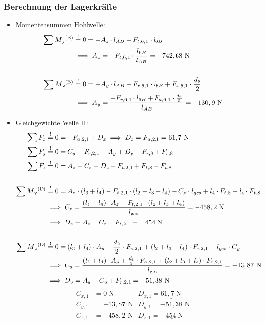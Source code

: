 \subsubsection{Berechnung der Lagerkräfte}
\begin{itemize}
\item Momentensummen Hohlwelle:
\begin{align*}
	\sum M\textsubscript{y}\textsuperscript{(B)} &\overset{!}{=} 0 = -A_z \cdot l_{AB} - F_{t,6,1} \cdot l_{6B} \\
	&\implies A_z = -F_{t,6,1} \cdot \frac{l_{6B}}{l_{AB}} = -742,68 \text{ N} \\ \\
	\sum M\textsubscript{z}\textsuperscript{(B)} &\overset{!}{=} 0 = -A_y \cdot l_{AB} - F_{r,6,1} \cdot l_{6B} + F_{a,6,1} \cdot \frac{d_6}{2}\\
	&\implies A_y = \frac{-F_{r,6,1} \cdot l_{6B} + F_{a,6,1} \cdot \frac{d_6}{2}} {l_{AB}}= -130,9 \text{ N} 
\end{align*}
\item Gleichgewichte Welle II:
\begin{align*}
	\sum F_x &\overset{!}{=} 0 = -F_{a,2,1} + D_x \implies D_x = F_{a,2,1} = 61,7 \text{ N} \\
	\sum F_y &\overset{!}{=} 0 = C_y - F_{r,2,1}-A_y +D_y - F_{r,8} + F_{r,8}\\ 
	\sum F_z &\overset{!}{=} 0 = A_z - C_z - D_z - F_{t,2,1} + F_{t,8} - F_{t,8}\\ \\
	\sum M\textsubscript{y}\textsuperscript{(D)} &\overset{!}{=} 0 = A_z \cdot (l_3+l_4)- F_{t,2,1} \cdot (l_2+l_3+l_4) - C_z \cdot l_{ges} +l_4 \cdot F_{t,8}- l_4 \cdot F_{t,8} \\ 
	&\implies C_z = \frac{(l_3+l_4) \cdot A_z - F_{t,2,1} \cdot (l_2+l_3+l_4)}{l_{ges}} = -458,2 \text { N} \\ 
	& \implies D_z = A_z - C_z - F_{t,2,1}= -454 \text{ N}\\ \\
	\sum M\textsubscript{z}\textsuperscript{(D)} &\overset{!}{=} 0 = (l_3+l_4) \cdot A_y + \frac{d_2}{2} \cdot F_{a,2,1} + (l_2+l_3+l_4) \cdot F_{r,2,1}- l_{ges} \cdot C_y  \\ 
	&\implies C_y = \frac{(l_3+l_4) \cdot A_y + \frac{d_2}{2} \cdot F_{a,2,1} + (l_2+l_3+l_4) \cdot F_{r,2,1}}{l\textsubscript{ges}} = -13,87 \text{ N}\\ 
	& \implies D_y =   A_y - C_y + F_{r,2,1} = -51,38\text{ N}
\end{align*}
\begin{align*}
	C_{x,1} &= \underline{0\text{ N}} & D_{x,1}= \underline{61,7\text{ N}}\\
	C_{y,1} &= \underline{-13,87\text{ N}} & D_{y,1}= \underline{-51,38\text{ N}}\\
	C_{z,1} &= \underline{-458,2\text{ N}} & D_{z,1}= \underline{-454\text{ N}}
\end{align*}
\end{itemize}
